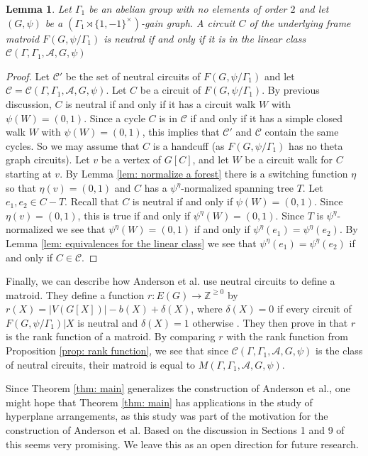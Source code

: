 \documentclass[12pt]{article}
\newtheorem{lemma}[theorem]{Lemma}
\theoremstyle{definition}
\newcommand{\bZ}{\mathbb Z}
\newcommand{\cA}{\mathcal{A}}
\newcommand{\cC}{\mathcal{C}}
\begin{document}
\begin{lemma}
Let $\Gamma_1$ be an abelian group with no elements of order $2$ and let $(G, \psi)$ be a $(\Gamma_1 \rtimes \{1,-1\}^{\times})$-gain graph. 
A circuit $C$ of the underlying frame matroid $F(G, \psi/\Gamma_1)$ is neutral if and only if it is in the linear class $\cC(\Gamma, \Gamma_1, \cA, G, \psi)$
\end{lemma}
\begin{proof}
Let $\cC'$ be the set of neutral circuits of $F(G, \psi/\Gamma_1)$ and let $\cC = \cC(\Gamma, \Gamma_1, \cA, G, \psi)$.
Let $C$ be a circuit of $F(G, \psi/\Gamma_1)$.
By previous discussion, $C$ is neutral if and only if it has a circuit walk $W$ with $\psi(W) = (0,1)$.
Since a cycle $C$ is in $\cC$ if and only if it has a simple closed walk $W$ with $\psi(W) = (0,1)$, this implies that $\cC'$ and $\cC$ contain the same cycles.
So we may assume that $C$ is a handcuff (as $F(G, \psi/\Gamma_1)$ has no theta graph circuits).
Let $v$ be a vertex of $G[C]$, and let $W$ be a circuit walk for $C$ starting at $v$.
By Lemma \ref{lem: normalize a forest} there is a switching function $\eta$ so that $\eta(v) = (0,1)$ and $C$ has a $\psi^{\eta}$-normalized spanning tree $T$.
Let $e_1,e_2 \in C - T$.
Recall that $C$ is neutral if and only if $\psi(W) = (0,1)$.
Since $\eta(v) = (0,1)$, this is true if and only if $\psi^{\eta}(W) = (0,1)$.
Since $T$ is $\psi^{\eta}$-normalized we see that $\psi^{\eta}(W) = (0,1)$ if and only if $\psi^{\eta}(e_1) = \psi^{\eta}(e_2)$.
By Lemma \ref{lem: equivalences for the linear class} we see that $\psi^{\eta}(e_1) = \psi^{\eta}(e_2)$ if and only if $C \in \cC$.
\end{proof}

Finally, we can describe how Anderson et al. use neutral circuits to define a matroid.
They define a function $r \colon E(G) \to \bZ^{\ge 0}$ by $r(X) = |V(G[X])| - b(X) + \delta(X)$, where $\delta(X) = 0$ if every circuit of $F(G, \psi/\Gamma_1)|X$ is neutral and $\delta(X) = 1$ otherwise \cite[Definition 4.1]{Anderson-Su-Zaslavsky2024}.
They then prove in \cite[Theorem 11.1]{Anderson-Su-Zaslavsky2024} that $r$ is the rank function of a matroid.
By comparing $r$ with the rank function from Proposition \ref{prop: rank function}, we see that since $\cC(\Gamma, \Gamma_1, \cA, G, \psi)$ is the class of neutral circuits, their matroid is equal to $M(\Gamma, \Gamma_1, \cA, G, \psi)$.


Since Theorem \ref{thm: main} generalizes the construction of Anderson et al., one might hope that Theorem \ref{thm: main} has applications in the study of hyperplane arrangements, as this study was part of the motivation for the construction of Anderson et al.
Based on the discussion in Sections 1 and 9 of \cite{Anderson-Su-Zaslavsky2024} this seems very promising. 
We leave this as an open direction for future research.
\end{document}
